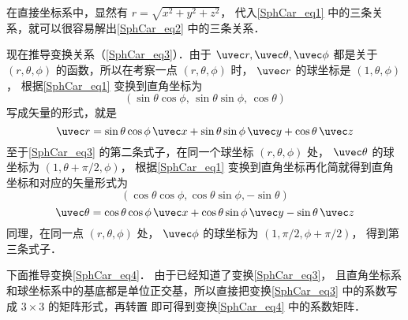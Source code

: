 在直接坐标系中，显然有 $r = \sqrt {x^2 + y^2 + z^2}$， 代入\autoref{SphCar_eq1} 中的三条关系，就可以很容易解出\autoref{SphCar_eq2} 中的三条关系．

现在推导变换关系（\autoref{SphCar_eq3}）．由于 $\uvec r,\uvec \theta ,\uvec \phi $ 都是关于 $\left( {r,\theta ,\phi } \right)$ 的函数，所以在考察一点 $\left( {r,\theta ,\phi } \right)$ 时， $\uvec r$ 的球坐标是 $\left( {1,\theta ,\phi } \right)$，  根据\autoref{SphCar_eq1} 变换到直角坐标为
\begin{equation}
(\sin \theta \cos \phi,\,\sin \theta \sin \phi,\,\cos \theta)
\end{equation}
写成矢量的形式，就是
 \begin{equation}
\uvec r = \sin \theta \cos \phi \,\uvec x + \sin \theta \sin \phi \,\uvec y + \cos \theta \,\uvec z
\end{equation}
至于\autoref{SphCar_eq3} 的第二条式子，在同一个球坐标 $(r,\theta ,\phi)$ 处， $\uvec \theta $ 的球坐标为 $\left( {1,\theta  + \pi /2,\phi } \right)$， 根据\autoref{SphCar_eq1} 变换到直角坐标再化简就得到直角坐标和对应的矢量形式为
\begin{equation}
\left( {\cos \theta \cos \phi ,\cos \theta \sin \phi , - \sin \theta } \right)
\end{equation}
 \begin{equation}
\uvec \theta  = \cos \theta \cos \phi \,\uvec x + \cos \theta \sin \phi \,\uvec y - \sin \theta \,\uvec z
\end{equation}
同理，在同一点 $\left( {r,\theta ,\phi } \right)$ 处， $\uvec \phi $ 的球坐标为 $\left( {1,\pi /2,\phi  + \pi /2} \right)$，  得到第三条式子．


下面推导变换\autoref{SphCar_eq4}． 由于已经知道了变换\autoref{SphCar_eq3}， 且直角坐标系和球坐标系中的基底都是单位正交基，所以直接把变换\autoref{SphCar_eq3} 中的系数写成 $3 \times 3$ 的矩阵形式，再转置 %
即可得到变换\autoref{SphCar_eq4} 中的系数矩阵．%


























